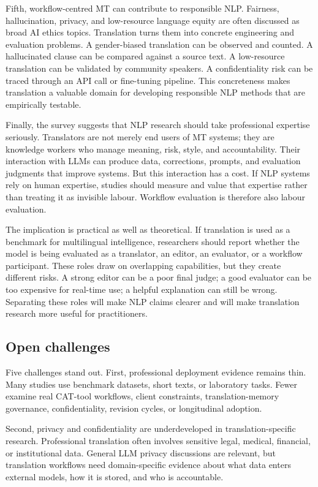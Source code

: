 \documentclass[11pt]{article}
\begin{document}
Fifth, workflow-centred MT can contribute to responsible NLP. Fairness, hallucination, privacy, and low-resource language equity are often discussed as broad AI ethics topics. Translation turns them into concrete engineering and evaluation problems. A gender-biased translation can be observed and counted. A hallucinated clause can be compared against a source text. A low-resource translation can be validated by community speakers. A confidentiality risk can be traced through an API call or fine-tuning pipeline. This concreteness makes translation a valuable domain for developing responsible NLP methods that are empirically testable.

Finally, the survey suggests that NLP research should take professional expertise seriously. Translators are not merely end users of MT systems; they are knowledge workers who manage meaning, risk, style, and accountability. Their interaction with LLMs can produce data, corrections, prompts, and evaluation judgments that improve systems. But this interaction has a cost. If NLP systems rely on human expertise, studies should measure and value that expertise rather than treating it as invisible labour. Workflow evaluation is therefore also labour evaluation.

The implication is practical as well as theoretical. If translation is used as a benchmark for multilingual intelligence, researchers should report whether the model is being evaluated as a translator, an editor, an evaluator, or a workflow participant. These roles draw on overlapping capabilities, but they create different risks. A strong editor can be a poor final judge; a good evaluator can be too expensive for real-time use; a helpful explanation can still be wrong. Separating these roles will make NLP claims clearer and will make translation research more useful for practitioners.

\subsection{Open challenges}
Five challenges stand out. First, professional deployment evidence remains thin. Many studies use benchmark datasets, short texts, or laboratory tasks. Fewer examine real CAT-tool workflows, client constraints, translation-memory governance, confidentiality, revision cycles, or longitudinal adoption.

Second, privacy and confidentiality are underdeveloped in translation-specific research. Professional translation often involves sensitive legal, medical, financial, or institutional data. General LLM privacy discussions are relevant, but translation workflows need domain-specific evidence about what data enters external models, how it is stored, and who is accountable.
\end{document}
